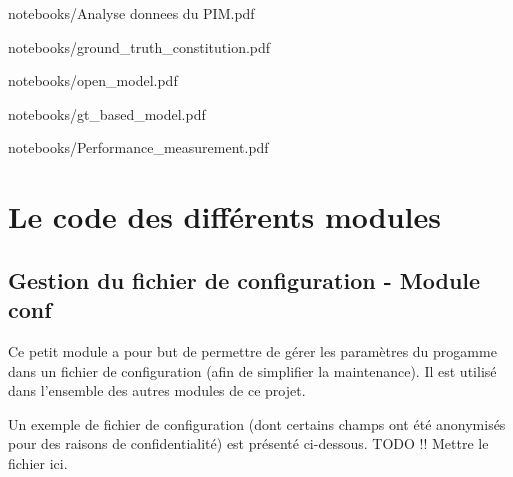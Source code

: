\documentclass{report}
\begin{document}
        
                    {notebooks/Analyse donnees du PIM.pdf}

        
        {notebooks/ground_truth_constitution.pdf}

        
        {notebooks/open_model.pdf}
 
        
        {notebooks/gt_based_model.pdf}

        
        {notebooks/Performance_measurement.pdf}        
     
    \chapter{Le code des différents modules}

    \section{Gestion du fichier de configuration - Module conf}
    \label{code:conf}
    Ce petit module a pour but de permettre de gérer les paramètres du progamme dans un fichier de configuration (afin de simplifier la maintenance).
    Il est utilisé dans l'ensemble des autres modules de ce projet.

    \begin{multicols}{2}
    \begin{spacing}{1.0}
    \end{spacing}
    \end{multicols}

    Un exemple de fichier de configuration (dont certains champs ont été anonymisés pour des raisons de confidentialité) est présenté ci-dessous.
    TODO !! Mettre le fichier ici.
\end{document}
